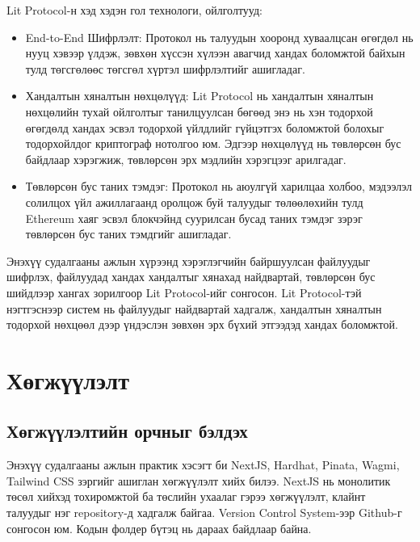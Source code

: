 Lit Protocol-н хэд хэдэн гол технологи, ойлголтууд:
\begin{itemize}
   \item  End-to-End Шифрлэлт: Протокол нь талуудын хооронд хуваалцсан өгөгдөл нь нууц хэвээр үлдэж, зөвхөн хүссэн хүлээн авагчид хандах боломжтой байхын тулд төгсгөлөөс төгсгөл хүртэл шифрлэлтийг ашигладаг.
   \item  Хандалтын хяналтын нөхцөлүүд: Lit Protocol нь хандалтын хяналтын нөхцөлийн тухай ойлголтыг танилцуулсан бөгөөд энэ нь хэн тодорхой өгөгдөлд хандах эсвэл тодорхой үйлдлийг гүйцэтгэх боломжтой болохыг тодорхойлдог криптограф нотолгоо юм. Эдгээр нөхцөлүүд нь төвлөрсөн бус байдлаар хэрэгжиж, төвлөрсөн эрх мэдлийн хэрэгцээг арилгадаг.
   \item Төвлөрсөн бус таних тэмдэг: Протокол нь аюулгүй харилцаа холбоо, мэдээлэл солилцох үйл ажиллагаанд оролцож буй талуудыг төлөөлөхийн тулд Ethereum хаяг эсвэл блокчэйнд суурилсан бусад таних тэмдэг зэрэг төвлөрсөн бус таних тэмдгийг ашигладаг.
\end{itemize}

Энэхүү судалгааны ажлын хүрээнд хэрэглэгчийн байршуулсан файлуудыг шифрлэх, файлуудад хандах хандалтыг хянахад найдвартай, төвлөрсөн бус шийдлээр хангах зорилгоор Lit Protocol-ийг сонгосон. Lit Protocol-тэй нэгтгэснээр систем нь файлуудыг найдвартай хадгалж, хандалтын хяналтын тодорхой нөхцөөл дээр үндэслэн зөвхөн эрх бүхий этгээдэд хандах боломжтой.

\newpage
\section{Хөгжүүлэлт}

\subsection{Хөгжүүлэлтийн орчныг бэлдэх}
Энэхүү судалгааны ажлын практик хэсэгт би NextJS, Hardhat, Pinata, Wagmi, Tailwind CSS зэргийг ашиглан хөгжүүлэлт хийх билээ. NextJS нь монолитик төсөл хийхэд тохиромжтой ба төслийн ухаалаг гэрээ хөгжүүлэлт, клайнт талуудыг нэг repository-д хадгалж байгаа. Version Control System-ээр Github-г сонгосон юм. Кодын фолдер бүтэц нь дараах байдлаар байна.

